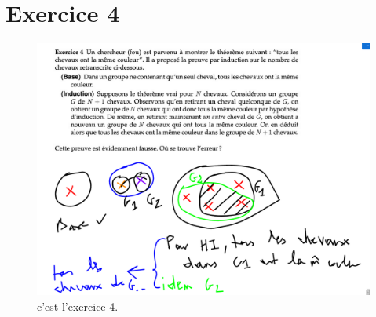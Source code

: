 \documentclass[a4paper, draft]{article}
\begin{document}
\section*{Exercice 4}
 \begin{figure}[!h]
\includegraphics[scale=0.3]{ex4}
c'est l'exercice 4.\\
\end{figure}
\end{document}
